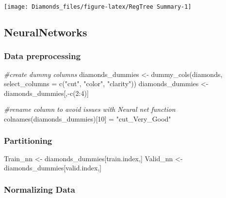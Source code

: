 \documentclass[
]{article}
\newenvironment{Shaded}{\begin{snugshade}}{\end{snugshade}}
\newcommand{\AttributeTok}[1]{\textcolor[rgb]{0.77,0.63,0.00}{#1}}
\newcommand{\CommentTok}[1]{\textcolor[rgb]{0.56,0.35,0.01}{\textit{#1}}}
\newcommand{\DecValTok}[1]{\textcolor[rgb]{0.00,0.00,0.81}{#1}}
\newcommand{\FunctionTok}[1]{\textcolor[rgb]{0.00,0.00,0.00}{#1}}
\newcommand{\NormalTok}[1]{#1}
\newcommand{\OtherTok}[1]{\textcolor[rgb]{0.56,0.35,0.01}{#1}}
\newcommand{\SpecialCharTok}[1]{\textcolor[rgb]{0.00,0.00,0.00}{#1}}
\newcommand{\StringTok}[1]{\textcolor[rgb]{0.31,0.60,0.02}{#1}}
\begin{document}
\begin{center}\texttt{[image: Diamonds\_files/figure-latex/RegTree Summary-1]} \end{center}

\hypertarget{neuralnetworks}{%
\subsection{NeuralNetworks}\label{neuralnetworks}}

\hypertarget{data-preprocessing}{%
\subsubsection{Data preprocessing}\label{data-preprocessing}}

\begin{Shaded}
\begin{Highlighting}[]
\CommentTok{\#create dummy columns }
\NormalTok{diamonds\_dummies }\OtherTok{\textless{}{-}} \FunctionTok{dummy\_cols}\NormalTok{(diamonds, }\AttributeTok{select\_columns =} \FunctionTok{c}\NormalTok{(}\StringTok{"cut"}\NormalTok{, }\StringTok{"color"}\NormalTok{, }\StringTok{"clarity"}\NormalTok{))}
\NormalTok{diamonds\_dummies }\OtherTok{\textless{}{-}}\NormalTok{ diamonds\_dummies[,}\SpecialCharTok{{-}}\FunctionTok{c}\NormalTok{(}\DecValTok{2}\SpecialCharTok{:}\DecValTok{4}\NormalTok{)]}

\CommentTok{\#rename column to avoid issues with Neural net function}
\FunctionTok{colnames}\NormalTok{(diamonds\_dummies)[}\DecValTok{10}\NormalTok{] }\OtherTok{=} \StringTok{"cut\_Very\_Good"}
\end{Highlighting}
\end{Shaded}

\hypertarget{partitioning-1}{%
\subsubsection{Partitioning}\label{partitioning-1}}

\begin{Shaded}
\begin{Highlighting}[]
\NormalTok{Train\_nn }\OtherTok{\textless{}{-}}\NormalTok{ diamonds\_dummies[train.index,]}
\NormalTok{Valid\_nn }\OtherTok{\textless{}{-}}\NormalTok{ diamonds\_dummies[valid.index,]}
\end{Highlighting}
\end{Shaded}

\hypertarget{normalizing-data}{%
\subsubsection{Normalizing Data}\label{normalizing-data}}
\end{document}
